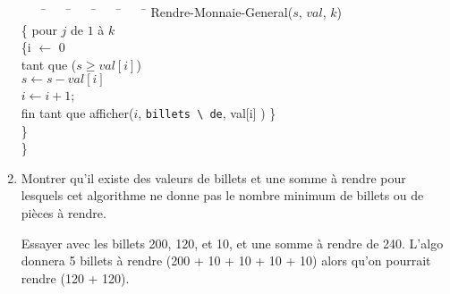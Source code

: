 \documentclass[10pt,a4paper]{article}
\begin{document}
\begin{enumerate}
\begin{tcolorbox}
\begin{tabbing}
~~~~\=~~~~\=~~~~\=~~~~\=~~~~\=\kill
Rendre-Monnaie-General($s$, $val$, $k$) \\
\>\{
\>pour $j$ de $1$ à $k$\+\\
  \>\{i $\leftarrow$ 0\\
       tant que ($s\geq val[i]$) \+\\
       $s\leftarrow s-val[i]$\\
    \>$i \leftarrow i+1$;\\
    fin tant que
    afficher($i$,  \verb  "billets \ de",  val[i] )
  \>\}\-\\
\>\}\-\\
\}\\

\end{tabbing}

\end{tcolorbox}

\item Montrer qu'il existe des valeurs de billets et une somme à rendre pour lesquels cet algorithme ne donne pas le nombre minimum de billets ou de pièces à rendre.

\begin{tcolorbox}
Essayer avec les billets 200, 120, et 10, et une somme à rendre de 240. L'algo donnera 5 billets à rendre (200 + 10 + 10 + 10 + 10) alors qu'on pourrait rendre (120 + 120).
\end{tcolorbox}

\end{enumerate}
\end{document}
